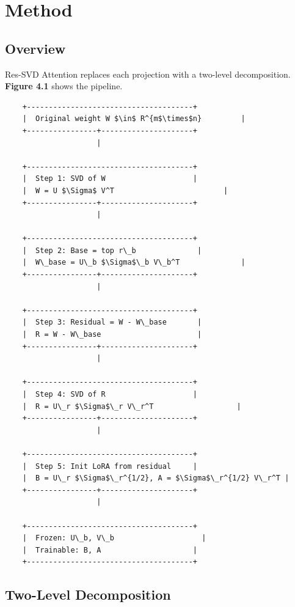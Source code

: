 \section{Method}

\subsection{Overview}

Res-SVD Attention replaces each projection with a two-level decomposition. 
\textbf{Figure 4.1} shows the pipeline.

\begin{lstlisting}
    +--------------------------------------+
    |  Original weight W $\in$ R^{m$\times$n}         |
    +----------------+---------------------+
                     |
                      
    +--------------------------------------+
    |  Step 1: SVD of W                    |
    |  W = U $\Sigma$ V^T                         |
    +----------------+---------------------+
                     |
                      
    +--------------------------------------+
    |  Step 2: Base = top r\_b              |
    |  W\_base = U\_b $\Sigma$\_b V\_b^T              |
    +----------------+---------------------+
                     |
                      
    +--------------------------------------+
    |  Step 3: Residual = W - W\_base       |
    |  R = W - W\_base                      |
    +----------------+---------------------+
                     |
                      
    +--------------------------------------+
    |  Step 4: SVD of R                    |
    |  R = U\_r $\Sigma$\_r V\_r^T                   |
    +----------------+---------------------+
                     |
                      
    +--------------------------------------+
    |  Step 5: Init LoRA from residual     |
    |  B = U\_r $\Sigma$\_r^{1/2}, A = $\Sigma$\_r^{1/2} V\_r^T |
    +----------------+---------------------+
                     |
                      
    +--------------------------------------+
    |  Frozen: U\_b, V\_b                    |
    |  Trainable: B, A                     |
    +--------------------------------------+
\end{lstlisting}

\subsection{Two-Level Decomposition}


